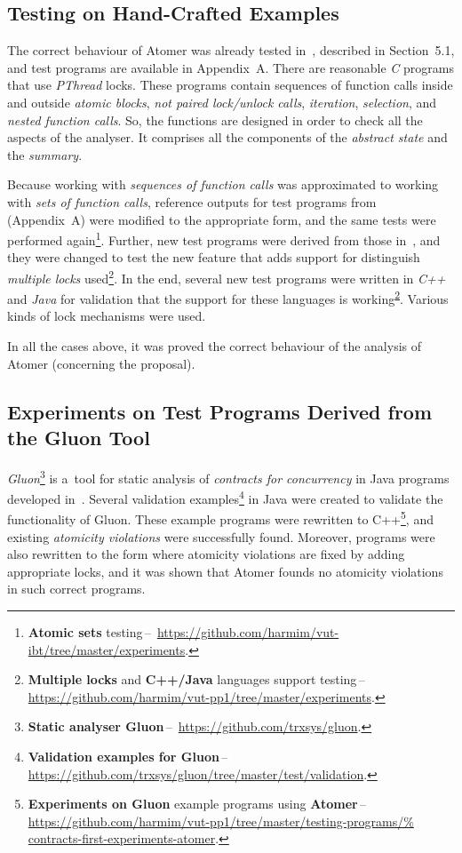 \subsection{Testing on Hand-Crafted Examples}
\label{sec:expPurpos}

The correct behaviour of Atomer was already tested in~\cite{harmimBP}, described
in Section~5.1, and test programs are available in Appendix~A. There are
reasonable \emph{C} programs that use \emph{PThread} locks. These programs
contain sequences of function calls inside and outside \emph{atomic blocks},
\emph{not paired lock/unlock calls}, \emph{iteration}, \emph{selection}, and
\emph{nested function calls}. So, the functions are designed in order to
check all the aspects of the analyser. It comprises all the components of
the \emph{abstract state} and the \emph{summary}.

Because working with \emph{sequences of function calls} was approximated to
working with \emph{sets of function calls}, reference outputs for test programs
from~\cite{harmimBP} (Appendix~A) were modified to the appropriate form, and the
same tests were performed again\footnote{\textbf{Atomic sets} testing\,--\,%
\url{https://github.com/harmim/vut-ibt/tree/master/experiments}.}. Further,
new test programs were derived from those in~\cite{harmimBP}, and they were
changed to test the new feature that adds support for distinguish \emph{multiple
locks} used\footnote{\label{fn:test2}\textbf{Multiple locks} and
\textbf{C++/Java} languages support testing\,--\,%
\url{https://github.com/harmim/vut-pp1/tree/master/experiments}.}. In the end,
several new test programs were written in \emph{C++} and \emph{Java}
for validation that the support for these languages is
working\textsuperscript{\ref{fn:test2}}. Various kinds of lock mechanisms were
used.

In all the cases above, it was proved the correct behaviour of the analysis
of Atomer (concerning the proposal).

\subsection{Experiments on Test Programs Derived from the Gluon Tool}
\label{sec:expGluon}

\emph{Gluon}\footnote{\textbf{Static analyser Gluon}\,--\,%
\url{https://github.com/trxsys/gluon}.} is a~tool for static analysis of
\emph{contracts for concurrency} in Java programs developed
in~\cite{contracts2015, contracts2017}. Several validation examples\footnote{%
\textbf{Validation examples for Gluon}\,--\,%
\url{https://github.com/trxsys/gluon/tree/master/test/validation}.} in Java
were created to validate the functionality of Gluon. These example programs were
rewritten to C++\footnote{\textbf{Experiments on Gluon} example programs using
\textbf{Atomer}\,--\,%
\url{https://github.com/harmim/vut-pp1/tree/master/testing-programs/%
contracts-first-experiments-atomer}.}, and existing \emph{atomicity violations}
were successfully found. Moreover, programs were also rewritten to the form
where atomicity violations are fixed by adding appropriate locks, and it was
shown that Atomer founds no atomicity violations in such correct programs.

